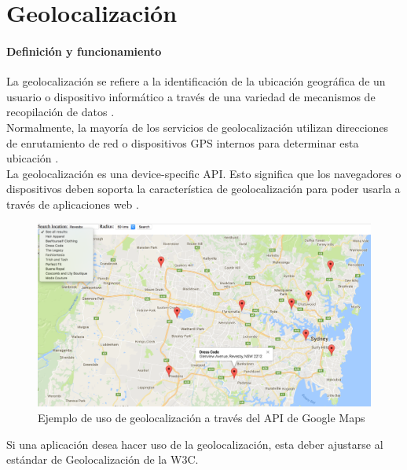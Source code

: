 \section{Geolocalización}
\paragraph{Definición y funcionamiento}La geolocalización se refiere a la identificación de la ubicación geográfica de un usuario o dispositivo informático a través de una variedad de mecanismos de recopilación de datos \citep{MarcoTeorico14}.
\\
Normalmente, la mayoría de los servicios de geolocalización utilizan direcciones de enrutamiento de red o dispositivos GPS internos para determinar esta ubicación \citep{MarcoTeorico14}.
\\
La geolocalización es una device-specific API. Esto significa que los navegadores o dispositivos deben soporta la característica de geolocalización para poder usarla a través de aplicaciones web \citep{MarcoTeorico14}.

\begin{figure}[H]
	\centering
	\includegraphics[scale=.17]{Capitulo2/images/geolocation}
	\caption{Ejemplo de uso de geolocalización a través del API de Google Maps}
	\label{fig:geolocation}
\end{figure}

Si una aplicación desea hacer uso de la geolocalización, esta deber ajustarse al estándar de Geolocalización de la W3C.

